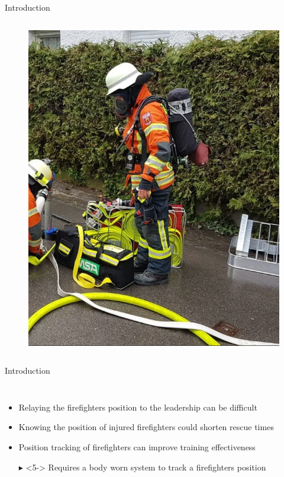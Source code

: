 \documentclass[aspectratio=169]{beamer}
\begin{document}
{\begin{frame}{Introduction}
\begin{columns}
			\begin{figure}
				\centering
				\includegraphics[height=0.7\textheight]{firefighter.png}
			\end{figure}
			
		\end{columns}
		
		
	\end{frame}
	
	\begin{frame}{Introduction}
			\begin{columns}
				\begin{itemize}
					\item<2-> Relaying the firefighters position to the leadership can be difficult
					\item<3-> Knowing the position of injured firefighters could shorten rescue times
					\item<4-> Position tracking of firefighters can improve training effectiveness
					\item[$\blacktriangleright$]<5-> Requires a body worn system to track a firefighters position
				\end{itemize}
		

\end{columns}
\end{frame}}
\end{document}
